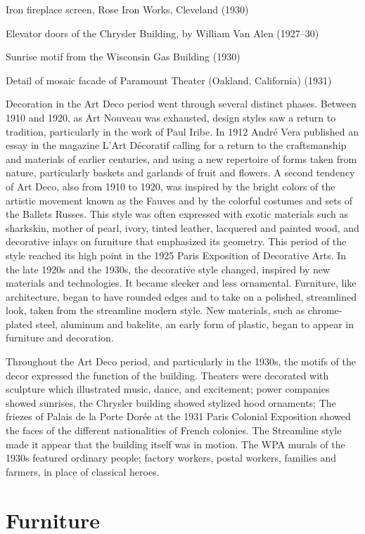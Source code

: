 Iron fireplace screen, Rose Iron Works, Cleveland (1930)

Elevator doors of the Chrysler Building, by William Van Alen (1927--30)

Sunrise motif from the Wisconsin Gas Building (1930)

Detail of mosaic facade of Paramount Theater (Oakland, California)
(1931)

Decoration in the Art Deco period went through several distinct phases.
Between 1910 and 1920, as Art Nouveau was exhausted, design styles saw a
return to tradition, particularly in the work of Paul Iribe. In 1912
André Vera published an essay in the magazine L'Art Décoratif calling
for a return to the craftsmanship and materials of earlier centuries,
and using a new repertoire of forms taken from nature, particularly
baskets and garlands of fruit and flowers. A second tendency of Art
Deco, also from 1910 to 1920, was inspired by the bright colors of the
artistic movement known as the Fauves and by the colorful costumes and
sets of the Ballets Russes. This style was often expressed with exotic
materials such as sharkskin, mother of pearl, ivory, tinted leather,
lacquered and painted wood, and decorative inlays on furniture that
emphasized its geometry. This period of the style reached its high point
in the 1925 Paris Exposition of Decorative Arts. In the late 1920s and
the 1930s, the decorative style changed, inspired by new materials and
technologies. It became sleeker and less ornamental. Furniture, like
architecture, began to have rounded edges and to take on a polished,
streamlined look, taken from the streamline modern style. New materials,
such as chrome-plated steel, aluminum and bakelite, an early form of
plastic, began to appear in furniture and decoration.

Throughout the Art Deco period, and particularly in the 1930s, the
motifs of the decor expressed the function of the building. Theaters
were decorated with sculpture which illustrated music, dance, and
excitement; power companies showed sunrises, the Chrysler building
showed stylized hood ornaments; The friezes of Palais de la Porte Dorée
at the 1931 Paris Colonial Exposition showed the faces of the different
nationalities of French colonies. The Streamline style made it appear
that the building itself was in motion. The WPA murals of the 1930s
featured ordinary people; factory workers, postal workers, families and
farmers, in place of classical heroes.

\section{Furniture}\label{furniture}

